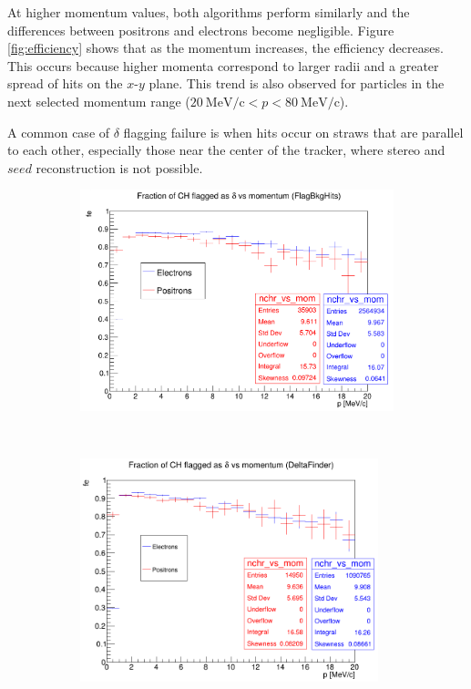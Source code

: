 At higher momentum values, both algorithms perform similarly and the 
differences between positrons and electrons become negligible. 
Figure \ref{fig:efficiency} shows that as the momentum 
increases, the efficiency decreases. This occurs because 
higher momenta correspond to larger radii and a 
greater spread of hits on the $x$-$y$ plane. This trend is also observed for particles in the 
next selected momentum range ($20 \ \text{MeV/c} <p<80 \ \text{MeV/c}$).

A common case of $\delta$ flagging failure is when hits 
occur on straws that are parallel to each other, especially those near 
the center of the tracker, where stereo and $seed$ reconstruction is not possible. 

\begin{figure}[!h]
    \centering
    \begin{subfigure}[t]{0.5\textwidth}
        \centering
        \includegraphics[width=1.\textwidth]{figures/png/Screenshot_20240818_155835.png}
        \caption{}
        \label{fig:eff1}
    \end{subfigure}%
    ~ 
    \begin{subfigure}[t]{0.5\textwidth}
        \centering
        \includegraphics[width=0.95\textwidth]{figures/png/Screenshot_20240813_203916.png}

\end{subfigure}
\end{figure}
